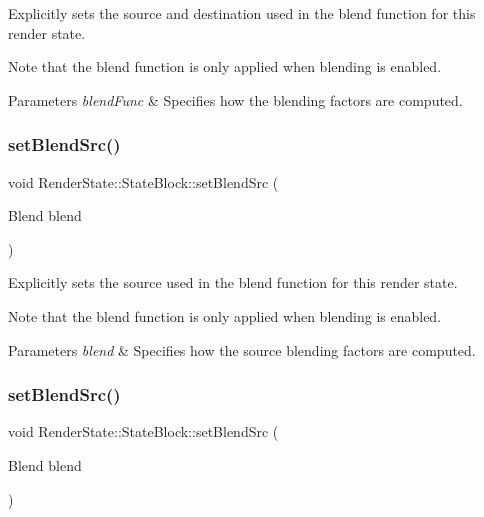 Explicitly sets the source and destination used in the blend function for this render state.

Note that the blend function is only applied when blending is enabled.


\begin{DoxyParams}{Parameters}
{\em blend\+Func} & Specifies how the blending factors are computed. \\
\hline
\end{DoxyParams}
\mbox{\label{classRenderState_1_1StateBlock_a1863a0ca059594f9c14e7311123951fe}} 
\subsubsection{\texorpdfstring{set\+Blend\+Src()}{setBlendSrc()}\hspace{0.1cm}{\footnotesize\ttfamily [1/2]}}
{\footnotesize\ttfamily void Render\+State\+::\+State\+Block\+::set\+Blend\+Src (\begin{DoxyParamCaption}\item[{Blend}]{blend }\end{DoxyParamCaption})}

Explicitly sets the source used in the blend function for this render state.

Note that the blend function is only applied when blending is enabled.


\begin{DoxyParams}{Parameters}
{\em blend} & Specifies how the source blending factors are computed. \\
\hline
\end{DoxyParams}
\mbox{\label{classRenderState_1_1StateBlock_a1863a0ca059594f9c14e7311123951fe}} 
\subsubsection{\texorpdfstring{set\+Blend\+Src()}{setBlendSrc()}\hspace{0.1cm}{\footnotesize\ttfamily [2/2]}}
{\footnotesize\ttfamily void Render\+State\+::\+State\+Block\+::set\+Blend\+Src (\begin{DoxyParamCaption}\item[{Blend}]{blend }\end{DoxyParamCaption})}

